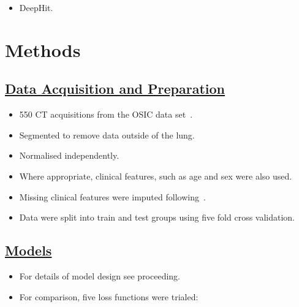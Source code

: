 \documentclass[landscape, color=UCLburgundy, margin=1cm]{uclposter}
\begin{document}
\begin{multicols}{2}
\begin{multicols}{2}
\begin{highlightbox}[UCLlightgreen]
\begin{itemize}
\begin{itemize}
                            \item DeepHit.
                        \end{itemize}
                    \end{itemize}
                \end{highlightbox}
    
            \section*{Methods}
                \subsection*{\underline{\textbf{Data Acquisition and Preparation}}}
                    \begin{itemize}
                        \item 550 \gls{CT} acquisitions from the \gls{OSIC} data set~\cite{OSICOSICRepository}.
                        
                        \item Segmented to remove data outside of the lung.
                        
                        \item Normalised independently.
                        
                        \item Where appropriate, clinical features, such as age and sex were also used.
                        
                        \item Missing clinical features were imputed following~\cite{Shahin2022SurvivalData}.
                        
                        \item Data were split into train and test groups using five fold cross validation.
                    \end{itemize}

                \subsection*{\underline{\textbf{Models}}}
                    \begin{itemize}
                        \item For details of model design see proceeding.
                
                        \item For comparison, five loss functions were trialed:
                

\end{itemize}
\end{multicols}
\end{multicols}
\end{document}
